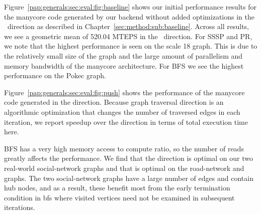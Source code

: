 Figure~\ref{pap:generals:sec:eval:fig:baseline} shows our initial performance results for the manycore code generated by our backend without added optimizations in the \pull~direction as described in Chapter~\ref{sec:method:sub:baseline}.
Across all results, we see a geometric mean of 520.04 MTEPS in the \pull~direction. %
For SSSP and PR, we note that the highest performance is seen on the \kron scale 18 graph.
This is due to the relatively small size of the graph and the large amount of parallelism and memory bandwidth of the manycore architecture.
For BFS we see the highest performance on the Pokec graph.
 
Figure~\ref{pap:generals:sec:eval:fig:push} shows the performance of the manycore code generated in the \push direction.
Because graph traversal direction is an algorithmic optimization that changes the number of traversed edges in each iteration, we report speedup over the \pull direction in terms of total execution time here.

BFS has a very high memory access to compute ratio, so the number of reads greatly affects the performance.
We find that the \pull direction is optimal on our two real-world social-network graphs and that \push is optimal on the road-network and \kron graphs.
The two social-network graphs have a large number of edges and contain hub nodes, and as a result, these benefit most from the early termination condition in bfs \pull where visited vertices need not be examined in subsequent iterations.
 
